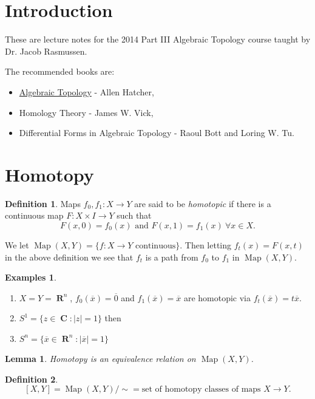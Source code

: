 \documentclass{article}
\newtheorem*{lem}{Lemma}
\theoremstyle{definition}
\newtheorem*{defn}{Definition}
\newtheorem*{exs}{Examples}
\DeclareMathOperator{\Map}{Map}
\DeclareMathOperator{\RR}{\mathbf{R}}
\DeclareMathOperator{\CC}{\mathbf{C}}
\begin{document}
\maketitle
\tableofcontents

\section{Introduction}
These are lecture notes for the 2014 Part III Algebraic Topology course taught by Dr. Jacob Rasmussen.


The recommended books are:
\begin{itemize}
\item \href{http://www.math.cornell.edu/~hatcher/AT/ATpage.html}{Algebraic Topology} - Allen Hatcher,%
\item Homology Theory - James W. Vick,
\item Differential Forms in Algebraic Topology - Raoul Bott and Loring W. Tu.
\end{itemize}
\clearpage

\section{Homotopy}

\begin{defn}
Maps $f_0,f_1\colon X \to Y$ are said to be \emph{homotopic} if there is a 
continuous map $F\colon X\times I \to Y$ such that
\[
F(x,0) = f_0(x)\text{ and }F(x,1) = f_1(x)\ \forall x\in X.
\]
\end{defn}

We let $\Map(X,Y) = \{f\colon X \to Y \text{ continuous}\}$.
Then letting $f_t(x) = F(x,t)$ in the above definition we see that $f_t$ is a
path from $f_0$ to $f_1$ in $\Map(X,Y)$.

\begin{exs}
\begin{enumerate}
  \item $X = Y = \RR^n$, $f_0(\overline{x}) = \overline{0}$ and $f_1(\overline{x})
  = \overline{x}$ are homotopic via $f_t(\overline{x}) = t\overline{x}$.
  \item $S^1 = \{z\in \CC : |z| = 1\}$ then %
  \item $S^n = \{ \overline{x} \in \RR^n : |\overline{x}| = 1\}$ %
\end{enumerate}
\end{exs}

\begin{lem}
  Homotopy is an equivalence relation on $\Map(X,Y)$.
\end{lem}
\begin{defn}
  \[
  [X,Y] = \Map(X,Y)/\sim = \text{set of homotopy classes of maps } X \to Y.
  \]
\end{defn}
\end{document}
